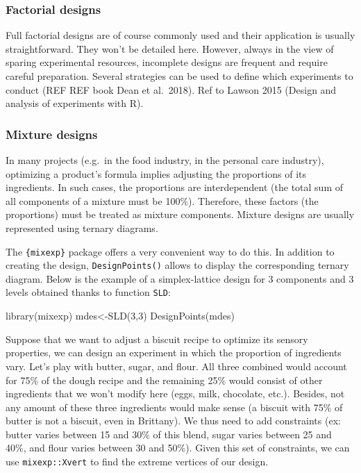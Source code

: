 \documentclass[
]{book}
\newenvironment{Shaded}{\begin{snugshade}}{\end{snugshade}}
\newcommand{\DecValTok}[1]{\textcolor[rgb]{0.00,0.00,0.81}{#1}}
\newcommand{\FunctionTok}[1]{\textcolor[rgb]{0.00,0.00,0.00}{#1}}
\newcommand{\NormalTok}[1]{#1}
\newcommand{\OtherTok}[1]{\textcolor[rgb]{0.56,0.35,0.01}{#1}}
\begin{document}
\hypertarget{factorial-designs}{%
\subsubsection{Factorial designs}\label{factorial-designs}}

Full factorial designs are of course commonly used and their application is usually straightforward. They won't be detailed here. However, always in the view of sparing experimental resources, incomplete designs are frequent and require careful preparation. Several strategies can be used to define which experiments to conduct (REF REF book Dean et al.~2018). Ref to Lawson 2015 (Design and analysis of experiments with R).

\hypertarget{mixture-designs}{%
\subsubsection{Mixture designs}\label{mixture-designs}}

In many projects (e.g.~in the food industry, in the personal care industry), optimizing a product's formula implies adjusting the proportions of its ingredients. In such cases, the proportions are interdependent (the total sum of all components of a mixture must be 100\%). Therefore, these factors (the proportions) must be treated as mixture components. Mixture designs are usually represented using ternary diagrams.

The \texttt{\{mixexp\}} package offers a very convenient way to do this. In addition to creating the design, \texttt{DesignPoints()} allows to display the corresponding ternary diagram. Below is the example of a simplex-lattice design for 3 components and 3 levels obtained thanks to function \texttt{SLD}:

\begin{Shaded}
\begin{Highlighting}[]
\FunctionTok{library}\NormalTok{(mixexp)}
\NormalTok{mdes}\OtherTok{\textless{}{-}}\FunctionTok{SLD}\NormalTok{(}\DecValTok{3}\NormalTok{,}\DecValTok{3}\NormalTok{)}
\FunctionTok{DesignPoints}\NormalTok{(mdes)}
\end{Highlighting}
\end{Shaded}

Suppose that we want to adjust a biscuit recipe to optimize its sensory properties, we can design an experiment in which the proportion of ingredients vary. Let's play with butter, sugar, and flour. All three combined would account for 75\% of the dough recipe and the remaining 25\% would consist of other ingredients that we won't modify here (eggs, milk, chocolate, etc.). Besides, not any amount of these three ingredients would make sense (a biscuit with 75\% of butter is not a biscuit, even in Brittany). We thus need to add constraints (ex: butter varies between 15 and 30\% of this blend, sugar varies between 25 and 40\%, and flour varies between 30 and 50\%). Given this set of constraints, we can use \texttt{mixexp::Xvert} to find the extreme vertices of our design.
\end{document}
